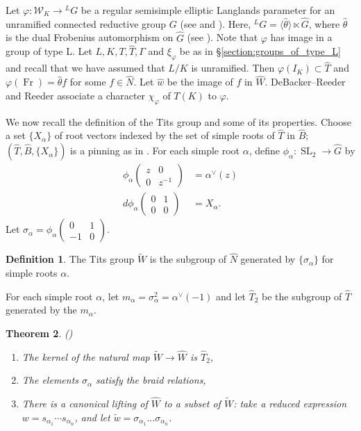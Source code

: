 \documentclass{compositio}
\theoremstyle{plain}
\newtheorem{theorem}{Theorem}[section]
\theoremstyle{definition}
\newtheorem{definition}[theorem]{Definition}
\DeclareMathOperator{\Fr}{Fr}
\DeclareMathOperator{\SL}{SL}
\newcommand{\Weil}{\mathcal{W}}
\begin{document}
Let $\varphi : \Weil_K \rightarrow {}^L G$ be a regular semisimple elliptic Langlands
parameter for an unramified connected reductive group $G$
(see \cite{reeder-debacker:09a} and \cite{reeder:08a}).
Here, ${}^L G = \langle \hat{\theta} \rangle \ltimes \hat{G}$,
where $\hat{\theta}$ is the dual Frobenius automorphism on $\hat{G}$
(see \cite[\S 3]{reeder-debacker:09a}).
Note that $\varphi$ has image in a group of
type L.  Let $L,K,T,\hat{T}, \Gamma$ and $\xi_{\varphi}$ be as in
\S\ref{section:groups_of_type_L} and recall that we have assumed that $L/K$ is unramified.
Then $\varphi(I_K) \subset \hat{T}$ and
$\varphi(\Fr) = \hat{\theta} f$ for some $f \in \hat{N}$.  Let $\hat{w}$
be the image of $f$ in $\hat{W}$.
DeBacker--Reeder \cite{reeder-debacker:09a} and Reeder \cite{reeder:08a}
associate a character $\chi_{\varphi}$ of $T(K)$ to $\varphi$.

We now recall the definition of
the Tits group and some of its properties.  Choose a set $\{ X_{\alpha} \}$ of root vectors
indexed by the set of simple roots of $\hat{T}$ in $\hat{B}$; $(\hat{T}, \hat{B}, \{X_{\alpha} \})$
is a pinning as in \cite[\S 3.1]{reeder:09a}.
For each simple root $\alpha$, define $\phi_{\alpha} : \SL_2 \rightarrow \hat{G}$
by
\begin{align*}
\phi_{\alpha}\begin{pmatrix}z & 0 \\ 0 & z^{-1}\end{pmatrix} &= \alpha^{\vee}(z) \\
d \phi_{\alpha}\begin{pmatrix}0 & 1 \\ 0 & 0\end{pmatrix} &= X_{\alpha}.
\end{align*}
Let $\sigma_{\alpha} = \phi_{\alpha}\begin{pmatrix}0 & 1 \\ -1 & 0\end{pmatrix}$.  

\begin{definition}
  The Tits group $\widetilde{W}$ is the subgroup of $\hat{N}$
  generated by $\{\sigma_{\alpha} \}$ for simple roots $\alpha$.
\end{definition}

For each simple root $\alpha$, let $m_{\alpha} = \sigma_{\alpha}^2 = \alpha^{\vee}(-1)$ and
let $\hat{T}_2$ be the subgroup of $\hat{T}$ generated by the $m_{\alpha}$.

\begin{theorem}{(\cite{tits:66a})}
\begin{enumerate}

\item The kernel of the natural map $\widetilde{W} \rightarrow \hat{W}$
  is $\hat{T}_2$,
\item The elements $\sigma_{\alpha}$ satisfy the braid relations,
\item There is a canonical lifting of $\hat{W}$ to a subset of
  $\widetilde{W}$: take a reduced expression $w = s_{\alpha_1} \cdots s_{\alpha_n}$,
  and let $\tilde{w} = \sigma_{\alpha_1} ... \sigma_{\alpha_n}$.
\end{enumerate}
\end{theorem}
\end{document}
